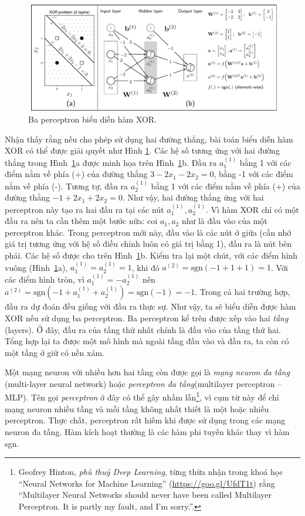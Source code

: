  
 
\begin{figure}[t]
\centering
    \includegraphics[width = \textwidth]{Chapters/05_NeuralNetworks/14_mlp/latex/xor_nn.pdf}
    \caption[]{Ba perceptron biểu diễn hàm XOR.}
    \label{fig:14_2}
\end{figure}

Nhận thấy rằng nếu cho phép sử dụng hai đường thẳng, bài toán biểu diễn hàm XOR
có thể được giải quyết như Hình \ref{fig:14_2}. Các hệ số tương ứng với hai
đường thẳng trong Hình~\ref{fig:14_2}a được minh họa trên Hình~\ref{fig:14_2}b. Đầu ra $a_1^{(1)}$ bằng 1
với các điểm nằm về phía (+) của đường thẳng $3 -2x_1 -2x_2 = 0$, bằng -1 với
các điểm nằm về phía (-). Tương tự, đầu ra $a_2^{(1)}$ bằng 1 với các điểm nằm về phía
(+) của đường thẳng $-1 +2x_1 + 2x_2 = 0$. Như vậy, hai đường thẳng ứng với hai
perceptron này tạo ra hai đầu ra tại các nút $a_1^{(1)}, a_2^{(1)}$. Vì hàm XOR
chỉ có một đầu ra nên ta cần thêm một bước nữa: coi $a_1, a_2$ như là đầu
vào của một perceptron khác. Trong perceptron mới này, đầu vào là các nút ở giữa
(cần nhớ giá trị tương ứng với hệ số điều chỉnh luôn có giá trị bằng 1), đầu ra là nút bên phải. Các hệ số
được cho trên Hình~\ref{fig:14_2}b. Kiểm tra lại một chút, với các điểm hình
vuông (Hình~\ref{fig:14_2}a), $a^{(1)}_1 = a^{(1)}_2 = 1$, khi đó $a^{(2)}
= \text{sgn}(-1 +1 + 1) = 1$. Với các điểm hình tròn, vì $a^{(1)}_1 =
-a^{(1)}_2$ nên $a^{(2)} = \text{sgn}(-1 + a^{(1)}_1 + a^{(1)}_2) =
\text{sgn}(-1) = -1$. Trong cả hai trường hợp, đầu ra dự đoán đều giống với đầu
ra thực sự. Như vậy, ta sẽ biểu diễn được hàm XOR nếu sử dụng ba perceptron. Ba perceptron kể trên được
xếp vào hai \textit{tầng} ({layers}). Ở đây, đầu ra của tầng thứ nhất chính là
đầu vào của tầng thứ hai. Tổng hợp lại ta được một mô hình mà ngoài tầng đầu
vào và đầu ra, ta còn có một tầng ở giữ có nền xám. 

Một mạng neuron với nhiều hơn hai tầng còn được gọi là \textit{mạng neuron đa tầng} (multi-layer neural network) hoặc \textit{perceptron đa tầng}(multilayer perceptron -- MLP). Tên gọi
\textit{perceptron} ở đây có thể gây nhầm lẫn\footnote{Geofrey Hinton,
\textit{phù thuỷ Deep Learning}, từng thừa nhận trong khoá học ``Neural Networks
for Machine Learning'' (\url{https://goo.gl/UfdT1t}) rằng ``Multilayer Neural
Networks should never have been called Multilayer Perceptron. It is partly my
fault, and I'm sorry.''.}, vì cụm từ này để chỉ mạng neuron nhiều tầng 
và mỗi tầng không nhất thiết là một hoặc
nhiều perceptron. Thực chất, perceptron rất hiếm khi được sử dụng trong các mạng neuron đa tầng. Hàm kích hoạt thường là các hàm phi tuyến khác thay vì hàm
sgn.

